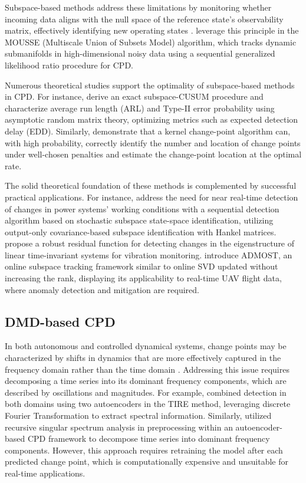 Subspace-based methods address these limitations by monitoring whether incoming data aligns with the null space of the reference state's observability matrix, effectively identifying new operating states \citep{Dohler2013, Ye2023}. \citet{Xie2013} leverage this principle in the MOUSSE (Multiscale Union of Subsets Model) algorithm, which tracks dynamic submanifolds in high-dimensional noisy data using a sequential generalized likelihood ratio procedure for CPD.

Numerous theoretical studies support the optimality of subspace-based methods in CPD. For instance, \citet{Ye2023} derive an exact subspace-CUSUM procedure and characterize average run length (ARL) and Type-II error probability using asymptotic random matrix theory, optimizing metrics such as expected detection delay (EDD). Similarly, \citet{Garreau2018} demonstrate that a kernel change-point algorithm can, with high probability, correctly identify the number and location of change points under well-chosen penalties and estimate the change-point location at the optimal rate.

The solid theoretical foundation of these methods is complemented by successful practical applications. For instance, \citet{Hosur2019} address the need for near real-time detection of changes in power systems' working conditions with a sequential detection algorithm based on stochastic subspace state-space identification, utilizing output-only covariance-based subspace identification with Hankel matrices. \citet{Dohler2013} propose a robust residual function for detecting changes in the eigenstructure of linear time-invariant systems for vibration monitoring. \citet{He2019} introduce ADMOST, an online subspace tracking framework similar to online SVD updated without increasing the rank, displaying its applicability to real-time UAV flight data, where anomaly detection and mitigation are required.

\subsection{DMD-based CPD}
In both autonomous and controlled dynamical systems, change points may be characterized by shifts in dynamics that are more effectively captured in the frequency domain rather than the time domain \citep{DeRyck2021, Gupta2022}. Addressing this issue requires decomposing a time series into its dominant frequency components, which are described by oscillations and magnitudes. For example, \citet{DeRyck2021} combined detection in both domains using two autoencoders in the TIRE method, leveraging discrete Fourier Transformation to extract spectral information. Similarly, \citet{Gupta2022} utilized recursive singular spectrum analysis in preprocessing within an autoencoder-based CPD framework to decompose time series into dominant frequency components. However, this approach requires retraining the model after each predicted change point, which is computationally expensive and unsuitable for real-time applications.

